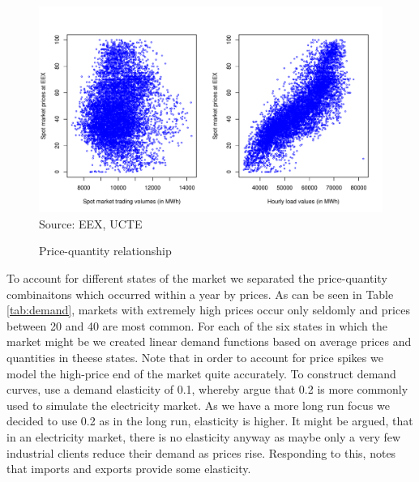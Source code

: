 \begin{figure}[htb]
  \centering
\caption{Price-quantity relationship}
  \includegraphics[width=.8\textwidth]{germandata/pricequant.pdf}
  \label{fig:investcosts}
\\
 \scriptsize Source: EEX, UCTE
\end{figure}

To account for different states of the market we separated the price-quantity combinaitons which occurred within a year by prices. As can be seen in Table \ref{tab:demand}, markets with extremely high prices occur only seldomly and prices between 20 and 40 are most common. For each of the six states in which the market might be we created linear demand functions based on average prices and quantities in theese states. Note that in order to account for price spikes we model the high-price end of the market quite accurately. To construct demand curves, \cite{Neuhoff2005} use a demand elasticity of 0.1, whereby \cite{Genc2007} argue that 0.2 is more commonly used to simulate the electricity market. As we have a more long run focus we decided to use 0.2 as in the long run, elasticity is higher. It might be argued, that in an electricity market, there is no elasticity anyway as maybe only a very few industrial clients reduce their demand as prices rise. Responding to this, \cite{Bushnell2003} notes that imports and exports provide some elasticity.

